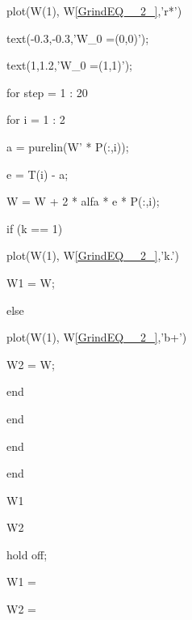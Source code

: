 \documentclass{article}
\begin{document}
    plot(W(1), W\eqref{GrindEQ__2_},'r*')

    text(-0.3,-0.3,'W\_0 =(0,0)');

    text(1,1.2,'W\_0 =(1,1)');

 for step = 1 : 20

\qquad    for i = 1 : 2

\qquad \qquad       a = purelin(W' * P(:,i));

\qquad \qquad       e = T(i) - a;

\qquad \qquad       W = W + 2 * alfa * e * P(:,i);

\qquad \qquad          if (k == 1)

\qquad \qquad \qquad             plot(W(1), W\eqref{GrindEQ__2_},'k.')

\qquad \qquad \qquad             W1 = W;

\qquad \qquad          else 

\qquad \qquad \qquad             plot(W(1), W\eqref{GrindEQ__2_},'b+')

 \qquad \qquad \qquad            W2 = W;

\qquad \qquad          end

\qquad \qquad    end

\qquad end

 end

 W1

 W2

 hold off; 

 

 W1 =



 W2 =


\end{document}
